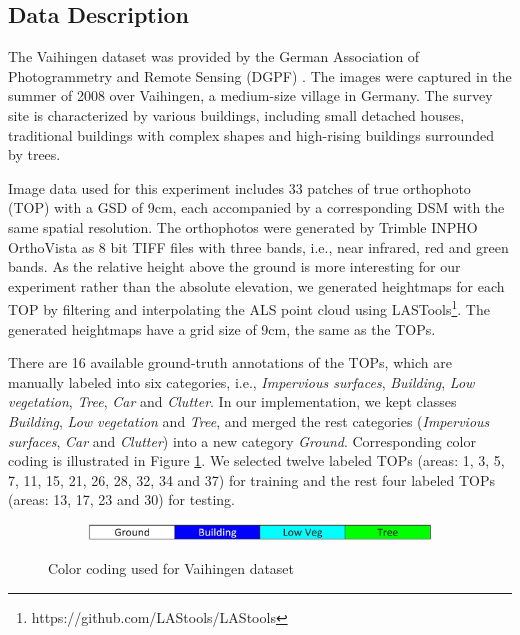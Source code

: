 \subsection{Data Description}
The Vaihingen dataset was %
provided by the German Association of Photogrammetry and Remote Sensing (DGPF) \cite{Cramer2010TheDO}. The images were captured in the summer of 2008 over Vaihingen, a medium-size village in Germany. The survey site is characterized by various buildings, including small detached houses, traditional buildings with complex shapes and high-rising buildings surrounded by trees. 

Image data used for this experiment includes 33 patches of true orthophoto (TOP) with a GSD of 9cm, each accompanied by a corresponding DSM with the same spatial resolution. The orthophotos were generated by Trimble INPHO OrthoVista as 8 bit TIFF files with three bands, i.e., near infrared, red and green bands. As the relative height above the ground is more interesting for our experiment rather than the absolute elevation, we generated heightmaps for each TOP by filtering and interpolating the ALS point cloud using LASTools\footnote{https://github.com/LAStools/LAStools}. The generated heightmaps have a grid size of 9cm, the same as the TOPs. 

There are 16 available ground-truth annotations of the TOPs, which are manually labeled into six categories, i.e., \textit{Impervious surfaces}, \textit{Building}, \textit{Low vegetation}, \textit{Tree}, \textit{Car} and \textit{Clutter}. In our implementation, we kept classes \textit{Building}, \textit{Low vegetation} and \textit{Tree}, and merged the rest categories (\textit{Impervious surfaces}, \textit{Car} and \textit{Clutter}) into a new category \textit{Ground}. Corresponding color coding is illustrated in Figure \ref{fig:colorbar_vai}. We selected twelve labeled TOPs (areas: 1, 3, 5, 7, 11, 15, 21, 26, 28, 32, 34 and 37) for training and the rest four labeled TOPs (areas: 13, 17, 23 and 30) for testing.
\begin{figure}[htb]
    \centering
\begin{subfigure}{0.8\columnwidth}
  \centering
  \includegraphics[width=1\linewidth]{fig/vai/colorbar_vai.JPG}
\end{subfigure} 
\caption{Color coding used for Vaihingen dataset}
       \label{fig:colorbar_vai}
\end{figure} 

